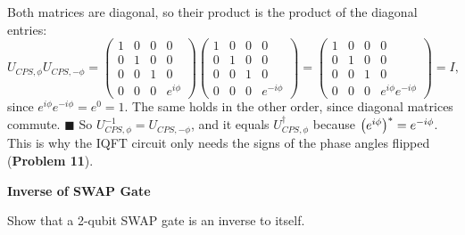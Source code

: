 \documentclass[a4paper, 10pt]{article}
\begin{document}
\begin{solution}
	\noindent Both matrices are diagonal, so their product is the product of the diagonal entries:
	\[
		U_{CPS, \phi}U_{CPS, -\phi} = \begin{pmatrix}
			1 & 0 & 0 & 0           \\
			0 & 1 & 0 & 0           \\
			0 & 0 & 1 & 0           \\
			0 & 0 & 0 & e^{i\phi}
		\end{pmatrix}\begin{pmatrix}
			1 & 0 & 0 & 0            \\
			0 & 1 & 0 & 0            \\
			0 & 0 & 1 & 0            \\
			0 & 0 & 0 & e^{-i\phi}
		\end{pmatrix} = \begin{pmatrix}
			1 & 0 & 0 & 0                     \\
			0 & 1 & 0 & 0                     \\
			0 & 0 & 1 & 0                     \\
			0 & 0 & 0 & e^{i\phi}e^{-i\phi}
		\end{pmatrix} = I,
	\]
	since \( e^{i\phi}e^{-i\phi} = e^{0} = 1 \).
	The same holds in the other order, since diagonal matrices commute. \( \blacksquare \)
	So \( U_{CPS, \phi}^{-1} = U_{CPS, -\phi} \), and it equals \( U_{CPS, \phi}^{\dagger} \) because \( \left(e^{i\phi}\right)^{*} = e^{-i\phi} \).
	This is why the IQFT circuit only needs the signs of the phase angles flipped (\textbf{Problem 11}).
\end{solution}

\begin{problem}
\textbf{Inverse of SWAP Gate}
\par Show that a 2-qubit SWAP gate is an inverse to itself.
\end{problem}
\end{document}
